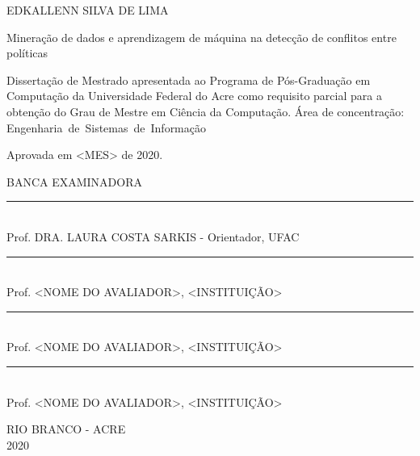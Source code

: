 \vspace{-60mm}

\begin{center}
   {\large EDKALLENN SILVA DE LIMA}\\
   \vspace{7mm}

   Mineração de dados e aprendizagem de máquina na detecção de conflitos entre políticas\\
  \vspace{10mm}
\end{center}

\noindent
\begin{flushright}
\begin{minipage}[t]{8cm}

Dissertação de Mestrado apresentada ao Programa de Pós-Gradua\c{c}\~{a}o em Computa\c{c}\~{a}o da Universidade Federal do Acre como requisito parcial para a obten\c{c}\~{a}o do \mbox{Grau} de Mestre em Ciência da Computação. \'{A}rea de concentra\c{c}\~{a}o: \mbox{Engenharia de Sistemas de Informação} 

\end{minipage}
\end{flushright}
\vspace{1.0 cm}
\noindent
Aprovada em <MES> de 2020. \\
\begin{flushright}
  \parbox{11cm}
  {
  \begin{center}
  BANCA EXAMINADORA \\
  \vspace{6mm}
  \rule{11cm}{.1mm} \\
    Prof. DRA. LAURA COSTA SARKIS - Orientador, UFAC \\
    \vspace{6mm}
  \rule{11cm}{.1mm} \\
    Prof. <NOME DO AVALIADOR>, <INSTITUI\c{C}\~AO>\\
    \vspace{6mm}
  \rule{11cm}{.1mm} \\
    Prof. <NOME DO AVALIADOR>, <INSTITUI\c{C}\~AO>\\
  \vspace{4mm}
  \rule{11cm}{.1mm} \\
    Prof. <NOME DO AVALIADOR>, <INSTITUI\c{C}\~AO>\\
    \vspace{6mm}

  \end{center}
  }
\end{flushright}
\begin{center}
  \vspace{4mm}
  RIO BRANCO - ACRE \\
  2020

\end{center}

